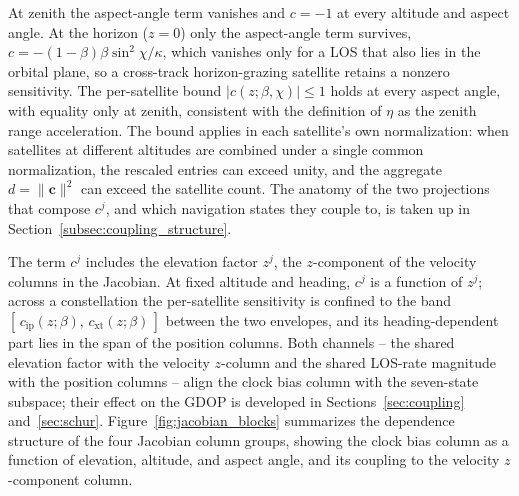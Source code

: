 \documentclass[letterpaper,times]{IONconf-v2}
\theoremstyle{plain}
\theoremstyle{remark}
\begin{document}
At zenith %
the aspect-angle term vanishes and $c=-1$ at every altitude and aspect angle. At the horizon ($z=0$) only the aspect-angle term survives, $c=-(1-\beta)\beta\sin^2\chi/\kappa$, which vanishes only for a LOS that also lies in the orbital plane, so a cross-track horizon-grazing satellite retains a nonzero sensitivity. The per-satellite bound $|c(z;\beta,\chi)|\le 1$ holds at every aspect angle, with equality only at zenith, consistent with the definition of $\eta$ as the zenith range acceleration. The bound applies in each satellite's own normalization: when satellites at different altitudes are combined under a single common normalization, the rescaled entries can exceed unity, and the aggregate $d=\|\mathbf{c}\|^2$ can exceed the satellite count. The anatomy of the two projections that compose $c^j$, and which navigation states they couple to, is taken up in Section~\ref{subsec:coupling_structure}.

The term $c^j$ includes the elevation factor $z^j$, the $z$-component of the velocity columns in the Jacobian. At fixed altitude and heading, $c^j$ is a function of $z^j$; across a constellation the per-satellite sensitivity is confined to the band $[\,c_{\mathrm{ip}}(z;\beta),\,c_{\mathrm{xt}}(z;\beta)\,]$ between the two envelopes, and its heading-dependent part lies in the span of the position columns. Both channels -- the shared elevation factor with the velocity $z$-column and the shared LOS-rate magnitude with the position columns -- align the clock bias column with the seven-state subspace; their effect on the GDOP is developed in Sections~\ref{sec:coupling} and~\ref{sec:schur}. Figure~\ref{fig:jacobian_blocks} summarizes the dependence structure of the four Jacobian column groups, showing the clock bias column as a function of elevation, altitude, and aspect angle, and its coupling to the velocity $z$-component column.
\end{document}
